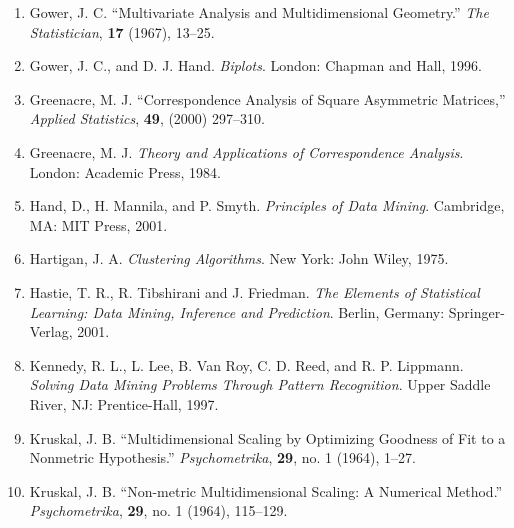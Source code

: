 \begin{enumerate}
\item Gower, J. C. “Multivariate Analysis and Multidimensional Geometry.” \textit{The Statistician}, \textbf{17} (1967), 13--25.
\item Gower, J. C., and D. J. Hand. \textit{Biplots}. London: Chapman and Hall, 1996.
\item Greenacre, M. J. “Correspondence Analysis of Square Asymmetric Matrices,” \textit{Applied Statistics}, \textbf{49}, (2000) 297--310.
\item Greenacre, M. J. \textit{Theory and Applications of Correspondence Analysis}. London: Academic Press, 1984.
\item Hand, D., H. Mannila, and P. Smyth. \textit{Principles of Data Mining}. Cambridge, MA: MIT Press, 2001.
\item Hartigan, J. A. \textit{Clustering Algorithms}. New York: John Wiley, 1975.
\item Hastie, T. R., R. Tibshirani and J. Friedman. \textit{The Elements of Statistical Learning: Data Mining, Inference and Prediction}. Berlin, Germany: Springer-Verlag, 2001.
\item Kennedy, R. L., L. Lee, B. Van Roy, C. D. Reed, and R. P. Lippmann. \textit{Solving Data Mining Problems Through Pattern Recognition}. Upper Saddle River, NJ: Prentice-Hall, 1997.
\item Kruskal, J. B. “Multidimensional Scaling by Optimizing Goodness of Fit to a Nonmetric Hypothesis.” \textit{Psychometrika}, \textbf{29}, no. 1 (1964), 1--27.
\item Kruskal, J. B. “Non-metric Multidimensional Scaling: A Numerical Method.” \textit{Psychometrika}, \textbf{29}, no. 1 (1964), 115--129.
\end{enumerate}
